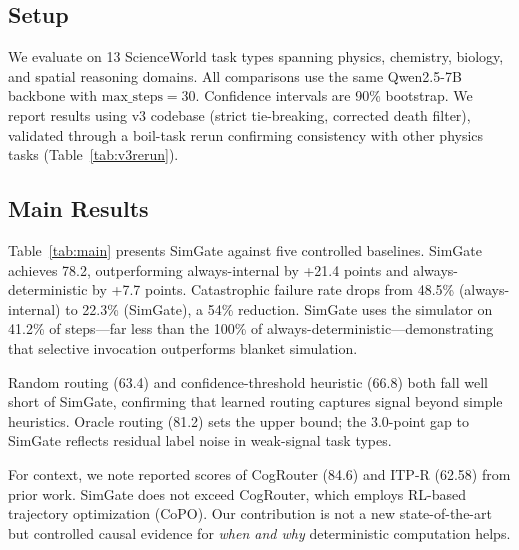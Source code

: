 \documentclass[11pt,a4paper]{article}
\begin{document}
\subsection{Setup}

We evaluate on 13 ScienceWorld task types spanning physics, chemistry, biology, and spatial reasoning domains. All comparisons use the same Qwen2.5-7B backbone with $\text{max\_steps}{=}30$. Confidence intervals are 90\% bootstrap. We report results using v3 codebase (strict tie-breaking, corrected death filter), validated through a boil-task rerun confirming consistency with other physics tasks (Table~\ref{tab:v3rerun}).

\subsection{Main Results}

Table~\ref{tab:main} presents SimGate against five controlled baselines. SimGate achieves 78.2, outperforming always-internal by +21.4 points and always-deterministic by +7.7 points. Catastrophic failure rate drops from 48.5\% (always-internal) to 22.3\% (SimGate), a 54\% reduction. SimGate uses the simulator on 41.2\% of steps---far less than the 100\% of always-deterministic---demonstrating that selective invocation outperforms blanket simulation.

Random routing (63.4) and confidence-threshold heuristic (66.8) both fall well short of SimGate, confirming that learned routing captures signal beyond simple heuristics. Oracle routing (81.2) sets the upper bound; the 3.0-point gap to SimGate reflects residual label noise in weak-signal task types.

For context, we note reported scores of CogRouter (84.6) and ITP-R (62.58) from prior work. SimGate does not exceed CogRouter, which employs RL-based trajectory optimization (CoPO). Our contribution is not a new state-of-the-art but controlled causal evidence for \emph{when and why} deterministic computation helps.
\end{document}
